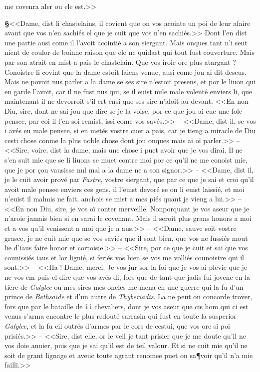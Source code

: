 \documentclass[12pt]{article} %
\newcommand{\persName}[1]{\emph{#1}} %
\newcommand{\placeName}[1]{\emph{#1}} %
\newcommand{\num}[1]{\texttt{#1}}    %
\newcounter{paranum}
\newcommand{\pnum}{\stepcounter{paranum}\textbf{§\arabic{paranum}}\quad}
\begin{document}
me covenra aler ou ele est.>>


\pnum <<Dame, dist li chastelains, il covient que on vos acointe un poi de leur afaire avant que vos n'en sachiés el que je cuit que vos n'en sachiés.>> Dont l'en dist une partie ausi come il l'avoit acointié a son siergant. Mais onques tant n'i seut nient de coulor de boinne raison que ele ne quidast qui tout fust couverture. Mais par son atrait en mist a pais le chastelain. Que vos iroie ore plus atargant ? Conoistre li covint que la dame estoit laiens venue, ausi come jou ai dit deseus. Mais ne povoit nus parler a la dame se ses sire n'estoit presens, et por le liuon qui en garde l'avoit, car il ne fust nus qui, se il euist nule male volenté enviers li, que maintenant il ne devorroit s'il ert ensi que ses sire n'aloit au devant. <<En non Diu, sire, dont ne sai jou que dire se je la voise, por ce que jou ai eue une fole pensee, par coi il l'en soi remist, issi come vos savés.>> -- <<Dame, dist il, se vos i avés eu male pensee, si en metés vostre cuer a pais, car je tieng a miracle de Diu cesti chose conme la plus noble chose dont jou onques mais ai oï parler.>> -- <<Sire, voire, dist la dame, mais une chose i puet avoir que je vos dirai. Il ne s'en suit mie que se li liuons se muet contre moi por ce qu'il ne me conoist mie, que je por çou vausisse nul mal a la dame ne a son signor.>> -- <<Dame, dist il, je le cuit avoir prové par \persName{Fastre}, vostre siergant, que par ce que je sai et croi qu'il avoit male pensee enviers ces gens, il l'euist devoré se on li euist laissié, et moi n'euist il malmis ne fait, anchois se mist a mes piés quant je vieng a lui.>> -- <<En non Diu, sire, je vos oï conter merveille. Nonporquant je vos aseur que je n'aroie jamais bien si en sarai le covenant. Mais il seroit plus grans honors a moi et a vos qu'il venissent a moi que je a aus.>> -- <<Dame, sauve soit vostre grasce, je ne cuit mie que se vos saviés que il sont bien, que vos ne fussiés mout lïe d'iaus faire honor et cortoisie.>> -- <<Sire, por ce que je cuit et sai que vos counissiés iaus et lor lignié, si feriés vos bien se vos me volliés counoistre qui il sont.>> -- <<Ha ! Dame, merci. Je vos jur sor la foi que je vos ai plevie que je ne vos em puis el dire que vos avés di, fors que de tant que jadis fui jovene en la tiere de \placeName{Galylee} ou mes sires mes oncles me mena en une guerre qui la fu d'un prince de \placeName{Bethsaïde} et d'un autre de \placeName{Thyberiadis}. La ne peut on concorde trover, fors que par le bataille de \num{ii} chevaliers, dont je vos aseur que cis hom qui ci est venus s'arma encontre le plus redouté sarrasin qui fust en toute la susperior \placeName{Galylee}, et la fu cil outrés d'armes par le cors de cestui, que vos ore si poi prisiés.>> -- <<Sire, dist elle, or le veil je tant prisier que je me doute qu'il ne vos doie anuier, puis que je sai qu'il est de teil valour. Et si ne cuit mie qu'il ne soit de grant lignage et aveuc toute agrant renomee puet on sa¶voir qu'il n'a mie failli.>>
\end{document}
